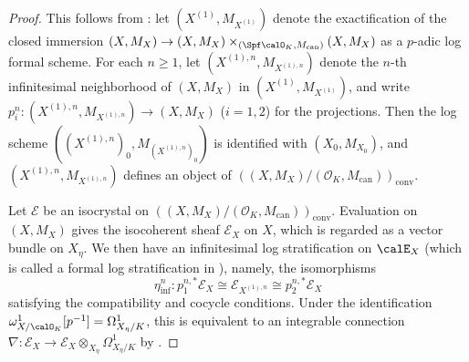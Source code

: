 \begin{proof}
This follows from \cite[Thm.~3.2.15, p.~624]{Shiho-I}:
let $(X^{(1)},M_{X^{(1)}})$ denote the exactification of the closed immersion $(X,M_X)\rightarrow (X,M_X)\times_{(\Spf \calO_K,M_\mathrm{can})}(X,M_X)$ as a $p$-adic log formal scheme. For each $n \geq 1$, let $(X^{(1),n}, M_{X^{(1),n}})$ denote the $n$-th infinitesimal neighborhood of $(X, M_X)$ in $(X^{(1)}, M_{X^{(1)}})$, and write $p_{i}^n\colon (X^{(1),n}, M_{X^{(1),n}}) \rightarrow (X, M_X)$ ($i = 1, 2$) for the projections. Then the log scheme $((X^{(1),n})_0,M_{(X^{(1),n})_0})$ is identified with $(X_0,M_{X_0})$, and 
$(X^{(1),n}, M_{X^{(1),n}})$ defines an object of $((X, M_X) / (\mathcal{O}_K, M_\mathrm{can}))_{\mathrm{conv}}$. 

Let $\mathcal{E}$ be an isocrystal on $((X, M_X) / (\mathcal{O}_K, M_\mathrm{can}))_{\mathrm{conv}}$. Evaluation on $(X,M_X)$ gives the isocoherent sheaf $\mathcal{E}_X$ on $X$, which is regarded as a vector bundle on $X_{\eta}$. We then have an infinitesimal log stratification on $\calE_X$ (which is called a formal log stratification in \cite[Def.~3.2.10]{Shiho-I}), namely, 
 the isomorphisms
\[
\eta_{\mathrm{inf}}^n\colon p_{1}^{n,\ast} \mathcal{E}_X \cong \mathcal{E}_{X^{(1),n}} \cong p_{2}^{n,\ast} \mathcal{E}_X
\]
satisfying the compatibility and cocycle conditions. Under the identification $\omega^1_{X/\calO_K}[p^{-1}]=\Omega^1_{X_\eta/K}$, this is equivalent to an integrable connection $\nabla\colon \mathcal{E}_X \rightarrow \mathcal{E}_X\otimes_{X_{\eta}} \Omega^1_{X_{\eta}/K}$ by \cite[Thm.~3.2.15]{Shiho-I}.
\end{proof}

